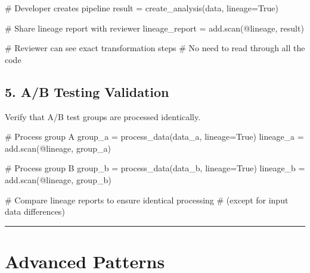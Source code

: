 \documentclass[
  letterpaper,
]{scrbook}
\newenvironment{Shaded}{\begin{snugshade}}{\end{snugshade}}
\newcommand{\CommentTok}[1]{\textcolor[rgb]{0.37,0.37,0.37}{#1}}
\newcommand{\NormalTok}[1]{\textcolor[rgb]{0.00,0.23,0.31}{#1}}
\newcommand{\OperatorTok}[1]{\textcolor[rgb]{0.37,0.37,0.37}{#1}}
\newcommand{\StringTok}[1]{\textcolor[rgb]{0.13,0.47,0.30}{#1}}
\newcommand{\VariableTok}[1]{\textcolor[rgb]{0.07,0.07,0.07}{#1}}
\begin{document}
\begin{Shaded}
\begin{Highlighting}[]
\CommentTok{\# Developer creates pipeline}
\NormalTok{result }\OperatorTok{=}\NormalTok{ create\_analysis(data, lineage}\OperatorTok{=}\VariableTok{True}\NormalTok{)}

\CommentTok{\# Share lineage report with reviewer}
\NormalTok{lineage\_report }\OperatorTok{=}\NormalTok{ add.scan(}\StringTok{\textquotesingle{}@lineage\textquotesingle{}}\NormalTok{, result)}

\CommentTok{\# Reviewer can see exact transformation steps}
\CommentTok{\# No need to read through all the code}
\end{Highlighting}
\end{Shaded}

\subsection{5. A/B Testing Validation}\label{ab-testing-validation}

Verify that A/B test groups are processed identically.

\begin{Shaded}
\begin{Highlighting}[]
\CommentTok{\# Process group A}
\NormalTok{group\_a }\OperatorTok{=}\NormalTok{ process\_data(data\_a, lineage}\OperatorTok{=}\VariableTok{True}\NormalTok{)}
\NormalTok{lineage\_a }\OperatorTok{=}\NormalTok{ add.scan(}\StringTok{\textquotesingle{}@lineage\textquotesingle{}}\NormalTok{, group\_a)}

\CommentTok{\# Process group B}
\NormalTok{group\_b }\OperatorTok{=}\NormalTok{ process\_data(data\_b, lineage}\OperatorTok{=}\VariableTok{True}\NormalTok{)}
\NormalTok{lineage\_b }\OperatorTok{=}\NormalTok{ add.scan(}\StringTok{\textquotesingle{}@lineage\textquotesingle{}}\NormalTok{, group\_b)}

\CommentTok{\# Compare lineage reports to ensure identical processing}
\CommentTok{\# (except for input data differences)}
\end{Highlighting}
\end{Shaded}

\begin{center}\rule{0.5\linewidth}{0.5pt}\end{center}

\section{Advanced Patterns}\label{advanced-patterns}
\end{document}
